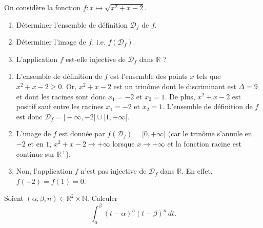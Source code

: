 \documentclass[a4paper, 11pt,openany]{book}%
\newtheorem[L]{thm}{Théorème}[section]
\newtheorem[M]{propo}[thm]{Proposition}
\newtheorem[M]{prop}[thm]{Propriété}
\newtheorem[M]{coro}[thm]{Corollaire}
\newtheorem[M]{lem}[thm]{Lemme}
\newtheorem[M,bodystyle=]{defi}[thm]{Définition}
\newtheorem[M,bodystyle=]{remark}[thm]{Remarque}
\newtheorem[M,bodystyle=]{met}[thm]{Méthode}
\newtheorem[M,bodystyle=]{ret}[thm]{A retenir}
\newtheorem[M,bodystyle=]{idee}[thm]{Idée}
\newtheorem[style=S,underline=false,bodystyle=]{exem}[thm]{Exemple}
\newtheorem[S,underline=false,bodystyle=]{exo}[thm]{Exercice}
\newtheorem[S,underline=false,bodystyle=]{appli}[thm]{Application}
\newtheorem[S,underline=false,bodystyle=]{sol}[thm]{Solution}
\newtheorem[S,underline=false,bodystyle=]{hypo}[thm]{Hypothesis}
\newtheorem[S,underline=false,bodystyle=]{nota}[thm]{Notation}
\newcommand{\R}{\mathbb{R}}
\newcommand{\calD}{\mathcal{D}}
\begin{document}
\begin{exo}
On considère la fonction 
$ f : x \mapsto \sqrt{x^2 + x - 2}$.
\begin{enumerate}
\item Déterminer l'ensemble de définition $\calD_f$ de $f$.
\item Déterminer l'image de $f$, i.e. $f(\calD_f)$.
\item L'application $f$ est-elle injective de $\calD_f$ dans $\R$ ?
\end{enumerate}
\end{exo}


\begin{sol}
\begin{enumerate}
\item L'ensemble de définition de $f$ est l'ensemble des points $x$ tels que $x^2 + x -2 \geqslant 0$. Or, $x^2 + x -2$ est un trinôme dont le discriminant est $\Delta = 9$ et dont les racines sont donc $x_1 = -2$ et $x_2 =1$. De plus, $x^2 +x -2$ est positif sauf entre les racines $x_1 = -2$ et $x_2= 1$. L'ensemble de définition de $f$ est donc $\calD_f = ]-\infty,-2] \cup [1, +\infty[$.
\item L'image de $f$ est donnée par $f(\calD_f) = [0,+\infty[$ (car le trinôme s'annule en $-2$ et en $1$, $x^2+x-2 \to + \infty$ lorsque $x \to + \infty$ et la fonction racine est continue sur $\R^+$).
\item Non, l'application $f$ n'est pas injective de $\calD_f$ dans $\R$. En effet, $f(-2) =  f(1)= 0$.
\end{enumerate}
\end{sol}





\begin{exo}

Soient $(\alpha, \beta, n) \in \mathbb{R}^2 \times \mathbb{N}$. Calculer 
\[ \int_{\alpha}^{\beta} (t-\alpha)^n (t - \beta)^n \, dt.\]

\end{exo}
\end{document}
